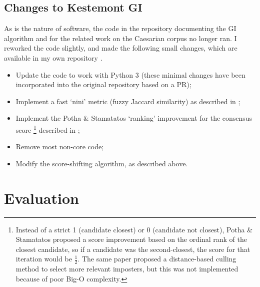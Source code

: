 \documentclass[
    hf
]{ceurart}
\begin{document}
\subsection{Changes to Kestemont GI}

As is the nature of software, the code in the repository documenting the GI algorithm and for the
related work on the Caesarian corpus no longer ran. I reworked the code slightly, and made the
following small changes, which are available in my own repository \cite{nagy_ruzicka}.

\begin{itemize}
    \item Update the code to work with Python 3 (these minimal changes have been incorporated into
          the original repository based on a PR);
    \item Implement a fast `nini' metric (fuzzy Jaccard similarity) as described in \cite{nini_aa};
    \item Implement the Potha \& Stamatatos `ranking' improvement for the consensus score%
          \footnote{ Instead of a strict 1 (candidate closest) or 0 (candidate not closest), Potha
              \& Stamatatos proposed a score improvement based on the ordinal rank of the closest
              candidate, so if a candidate was the second-closest, the score for that iteration
              would be $\frac{1}{2}$. The same paper proposed a distance-based culling method to
              select more relevant imposters, but this was not implemented because of poor Big-O
              complexity.}
          described in \cite{potha_improved_gi};
    \item Remove most non-core code;
    \item Modify the score-shifting algorithm, as described above.
\end{itemize}

\section{Evaluation}
\end{document}
